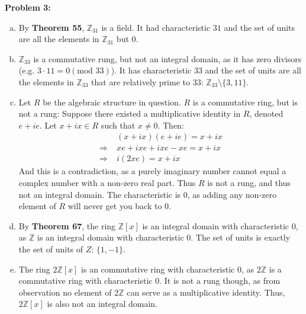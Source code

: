 \documentclass[12pt, letterpaper]{article}
\newenvironment{problem}
    [1]
    {\noindent \textbf{Problem #1:}}
    {\vspace{3mm}}
\begin{document}
\begin{problem}{3}
    \begin{enumerate}[(a)]
        \item By \textbf{Theorem 55}, $\mathbb{Z}_{31}$ is a field. It had characteristic $31$ and 
        the set of units are all the elements in $\mathbb{Z}_{31}$ but $0$.

        \item $\mathbb{Z}_{33}$ is a commutative rung, but not an integral domain, as it has zero 
        divisors (e.g. $3 \cdot 11 = 0 (\text{mod } 33)$). It has characteristic $33$ and the set 
        of units are all the elements in $\mathbb{Z}_{33}$ that are relatively prime to $33$: 
        $\mathbb{Z}_{33} \setminus \{3, 11\}$.

        \item Let $R$ be the algebraic structure in question. $R$ is a commutative ring, but is
        not a rung: Suppose there existed a multiplicative identity in $R$, denoted $e + ie$. Let
        $x + ix \in R$ such that $x \neq 0$. Then:
        \begin{align*}
            &(x + ix)(e + ie) = x + ix\\
            \Rightarrow \; &xe + ixe + ixe -xe = x + ix\\
            \Rightarrow \; &i(2xe) = x + ix
        \end{align*}
        And this is a contradiction, as a purely imaginary number cannot equal a complex number
        with a non-zero real part. Thus $R$ is not a rung, and thus not an integral domain. 
        The characteristic is $0$, as adding any non-zero element of $R$ will never get you back 
        to $0$.

        \item By \textbf{Theorem 67}, the ring $\mathbb{Z}[x]$ is an integral domain with characteristic
        $0$, as $\mathbb{Z}$ is an integral domain with characteristic $0$. The set of units is exactly
        the set of units of $Z$: $\{1, -1\}$.

        \item The ring $2\mathbb{Z}[x]$ is an commutative ring with characteristic $0$, as $2\mathbb{Z}$ 
        is a commutative ring with characteristic $0$. It is not a rung though, as from observation no 
        element of $2\mathbb{Z}$ can serve as a multiplicative identity. Thus, $2\mathbb{Z}[x]$ is also
        not an integral domain.

    \end{enumerate}
\end{problem}
\end{document}
